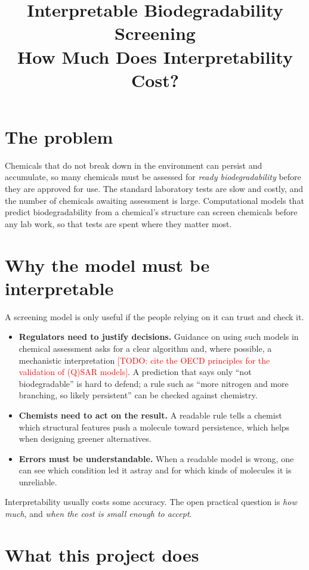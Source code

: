 \documentclass[11pt]{article}
\title{Interpretable Biodegradability Screening\\[2pt] \large How Much Does Interpretability Cost?}
\author{\todo{Team names}}
\date{\todo{Date}}
\newcommand{\todo}[1]{\textcolor{red}{[TODO: #1]}}
\begin{document}
\maketitle

\section*{The problem}

Chemicals that do not break down in the environment can persist and accumulate, so many chemicals
must be assessed for \emph{ready biodegradability} before they are approved for use. The standard
laboratory tests are slow and costly, and the number of chemicals awaiting assessment is large.
Computational models that predict biodegradability from a chemical's structure can screen chemicals
before any lab work, so that tests are spent where they matter most.

\section*{Why the model must be interpretable}

A screening model is only useful if the people relying on it can trust and check it.
\begin{itemize}
  \item \textbf{Regulators need to justify decisions.} Guidance on using such models in chemical
        assessment asks for a clear algorithm and, where possible, a mechanistic interpretation
        \todo{cite the OECD principles for the validation of (Q)SAR models}. A prediction that says
        only ``not biodegradable'' is hard to defend; a rule such as ``more nitrogen and more
        branching, so likely persistent'' can be checked against chemistry.
  \item \textbf{Chemists need to act on the result.} A readable rule tells a chemist which
        structural features push a molecule toward persistence, which helps when designing greener
        alternatives.
  \item \textbf{Errors must be understandable.} When a readable model is wrong, one can see which
        condition led it astray and for which kinds of molecules it is unreliable.
\end{itemize}
Interpretability usually costs some accuracy. The open practical question is \emph{how much}, and
\emph{when the cost is small enough to accept}.

\section*{What this project does}
\end{document}
